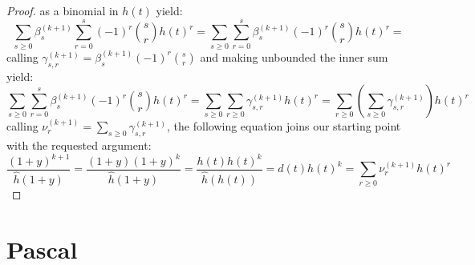 \documentclass[11pt,a4paper]{article} %
\begin{document}
\begin{proof}
    as a binomial in $h(t)$ yield:
    \begin{displaymath}
        \sum_{s\geq 0}{\beta_{s}^{(k+1)} {\sum_{r=0}^{s}{(-1)^{r}{{s}\choose{r}} h(t)^{r}}}} =
        \sum_{s\geq 0}{ \sum_{r=0}^{s}{\beta_{s}^{(k+1)}(-1)^{r}{{s}\choose{r}} h(t)^{r}}} =
    \end{displaymath}
    calling $\gamma_{s,r}^{(k+1)}=\beta_{s}^{(k+1)}(-1)^{r}{{s}\choose{r}}$ and making 
    unbounded the inner sum yield: 
    \begin{displaymath}
        \sum_{s\geq 0}{ \sum_{r=0}^{s}{\beta_{s}^{(k+1)}(-1)^{r}{{s}\choose{r}} h(t)^{r}}} =
        \sum_{s\geq 0}{ \sum_{r\geq 0}{\gamma_{s,r}^{(k+1)} h(t)^{r}}} =
        \sum_{r\geq 0}{ \left(\sum_{s\geq 0}{\gamma_{s,r}^{(k+1)} }\right) h(t)^{r}}
    \end{displaymath}
    calling $\nu_{r}^{(k+1)}=\sum_{s\geq 0}{\gamma_{s,r}^{(k+1)} }$, the following equation
    joins our starting point with the requested argument:
    \begin{displaymath}
        \frac{(1+y)^{k+1}}{ \hat{h}(1+y)} = 
        \frac{(1+y)(1+y)^{k}}{ \hat{h}(1+y)} = 
        \frac{h(t)h(t)^{k}}{ \hat{h}(h(t))} = 
        d(t)h(t)^{k} = \sum_{r\geq 0}{ \nu_{r}^{(k+1)} h(t)^{r}}
    \end{displaymath}

    \end{proof}



    \section{Pascal}
\end{document}
